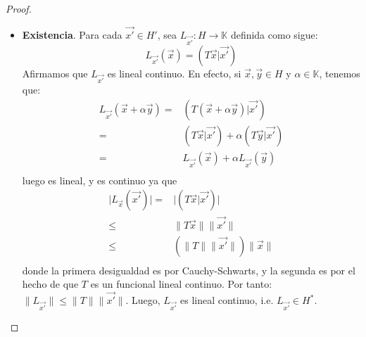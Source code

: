 \documentclass[12pt]{report}
\newcounter{it}
\theoremstyle{largebreak}
\newcommand\abs[1]{\ensuremath{\big|#1\big|}}
\newcommand\cf[3]{\ensuremath{#1:#2\rightarrow#3}}
\newcommand\pint[2]{\ensuremath{\left(#1\big|#2\right)}}
\newcommand\norm[1]{\ensuremath{\|#1\|}}
\begin{document}
\begin{proof}
\begin{itemize}
            \item \textbf{Existencia}. Para cada $\vec{x'}\in H'$, sea $\cf{L_{\vec{x'}}}{H}{\mathbb{K}}$ definida como sigue:
            \begin{equation*}
                L_{\vec{x'}}(\vec{x})=\pint{T\vec{x}}{\vec{x'}}
            \end{equation*}
            Afirmamos que $L_{\vec{x'}}$ es lineal continuo. En efecto, si $\vec{x},\vec{y}\in H$ y $\alpha\in\mathbb{K}$, tenemos que:
            \begin{equation*}
                \begin{split}
                    L_{\vec{x'}}(\vec{x}+\alpha\vec{y})=&\pint{T(\vec{x}+\alpha\vec{y})}{\vec{x'}} \\
                    =&\pint{T\vec{x}}{\vec{x'}}+\alpha\pint{T\vec{y}}{\vec{x'}} \\
                    =& L_{\vec{x'}}(\vec{x})+\alpha L_{\vec{x'}}(\vec{y})\\
                \end{split}
            \end{equation*}
            luego es lineal, y es continuo ya que
            \begin{equation*}
                \begin{split}
                    \abs{L_{\vec{x}}(\vec{x'})}=&\abs{\pint{T\vec{x}}{\vec{x'}}}\\
                    \leq&\norm{T\vec{x}}\norm{\vec{x'}} \\
                    \leq&(\norm{T}\norm{\vec{x'}})\norm{\vec{x}} \\
                \end{split}
            \end{equation*}
            donde la primera desigualdad es por Cauchy-Schwarts, y la segunda es por el hecho de que $T$ es un funcional lineal continuo. Por tanto: $\norm{L_{\vec{x'}}}\leq\norm{T}\norm{\vec{x'}}$. Luego, $L_{\vec{x'}}$ es lineal continuo, i.e. $L_{\vec{x'}}\in H^*$.


\end{itemize}
\end{proof}
\end{document}
